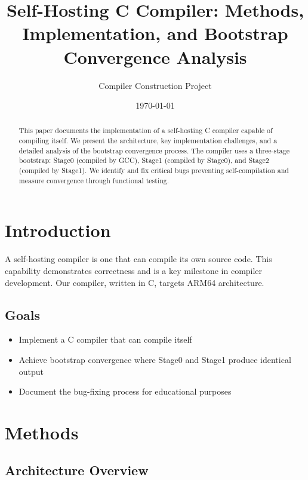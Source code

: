 \documentclass{article}
\title{Self-Hosting C Compiler: Methods, Implementation, and Bootstrap Convergence Analysis}
\author{Compiler Construction Project}
\date{\today}
\begin{document}
\maketitle

\begin{abstract}
This paper documents the implementation of a self-hosting C compiler capable of compiling itself. We present the architecture, key implementation challenges, and a detailed analysis of the bootstrap convergence process. The compiler uses a three-stage bootstrap: Stage0 (compiled by GCC), Stage1 (compiled by Stage0), and Stage2 (compiled by Stage1). We identify and fix critical bugs preventing self-compilation and measure convergence through functional testing.
\end{abstract}

\section{Introduction}

A self-hosting compiler is one that can compile its own source code. This capability demonstrates correctness and is a key milestone in compiler development. Our compiler, written in C, targets ARM64 architecture.

\subsection{Goals}
\begin{itemize}
    \item Implement a C compiler that can compile itself
    \item Achieve bootstrap convergence where Stage0 and Stage1 produce identical output
    \item Document the bug-fixing process for educational purposes
\end{itemize}

\section{Methods}

\subsection{Architecture Overview}
\end{document}
